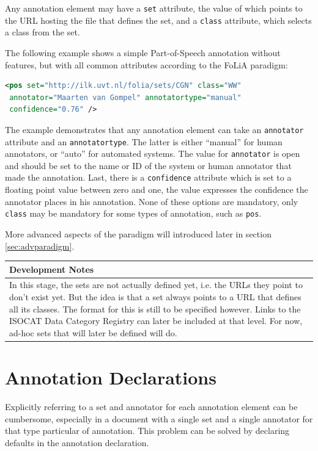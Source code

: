 \documentclass[a4paper,12pt]{report}
\newenvironment{devnotes}
{
\begin{center}
    \begin{tabular}[h!]{|p{0.8\textwidth}|}
    \hline
    {\bf Development Notes}\\\hline}
{   \\\hline
    \end{tabular}
\end{center}}
\begin{document}
Any annotation element may have a \texttt{set} attribute, the value of which points to the URL hosting the file that defines the set, and a \texttt{class} attribute, which selects a class from the set.

The following example shows a simple Part-of-Speech annotation without features, but with all common attributes according to the FoLiA paradigm:

\begin{lstlisting}[language=xml]
<pos set="http://ilk.uvt.nl/folia/sets/CGN" class="WW" 
 annotator="Maarten van Gompel" annotatortype="manual"
 confidence="0.76" />
\end{lstlisting}

The example demonstrates that any annotation element can take an \texttt{annotator} attribute and an \texttt{annotatortype}. The latter is either ``manual'' for human annotators, or ``auto'' for automated systems.  The value for \texttt{annotator} is open and should be set to the name or ID of the system or human annotator that made the annotation. Last, there is a \texttt{confidence} attribute which is set to a floating point value between zero and one, the value expresses the confidence the annotator places in his annotation. None of these options are mandatory, only \texttt{class} may be mandatory for some types of annotation, such as \texttt{pos}.

More advanced aspects of the paradigm will introduced later in section \ref{sec:advparadigm}.

\begin{devnotes}
In this stage, the sets are not actually defined yet, i.e. the URLs they point to don't exist yet. But the idea is that a set always points to a URL that defines all its classes. The format for this is still to be specified however. Links to the ISOCAT Data Category Registry can later be included at that level. For now, ad-hoc sets that will later be defined will do.
\end{devnotes}


\section{Annotation Declarations}

Explicitly referring to a set and annotator for each annotation element can be cumbersome, especially in a document with a single set and a single annotator for that type particular of annotation. This problem can be solved by declaring defaults in the annotation declaration.
\end{document}
